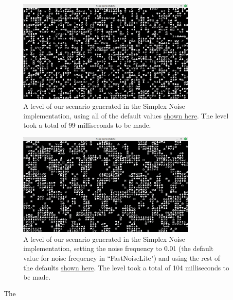 \begin{figure}[H]
    \centering
    \includegraphics[width=0.8\textwidth]{Images/simplex_smooth_default_1.png}
    \caption{A level of our scenario generated in the Simplex Noise implementation, using all of the default values \hyperref[noisedefaults]{shown here}. The level took a total of 99 milliseconds to be made.}
    \label{fig:simplexsmoothdefault1}
\end{figure}

\begin{figure}[H]
    \centering
    \includegraphics[width=0.8\textwidth]{Images/simplex_smooth_0.01_frequency.png}
    \caption{A level of our scenario generated in the Simplex Noise implementation, setting the noise frequency to 0.01 (the default value for noise frequency in ``FastNoiseLite") and using the rest of the defaults \hyperref[noisedefaults]{shown here}. The level took a total of 104 milliseconds to be made.}
    \label{fig:simplexsmooth0.01}
\end{figure}

The 